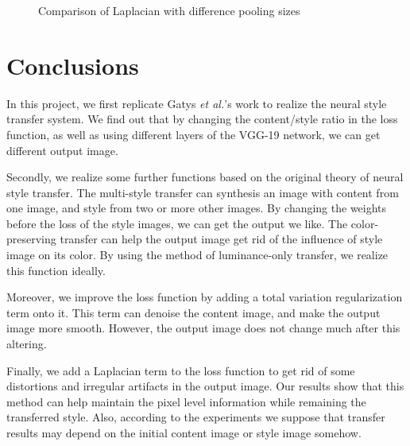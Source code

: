 \documentclass[runningheads]{llncs}
\begin{document}
\begin{figure}[h!]
\caption{Comparison of Laplacian with difference pooling sizes}
\label{fig:lap_size}
\end{figure}


\section{Conclusions}
In this project, we first replicate Gatys \textit{et al.}'s work to realize the neural style transfer system. We find out that by changing the content/style ratio in the loss function, as well as using different layers of the VGG-19 network, we can get different output image.

Secondly, we realize some further functions based on the original theory of neural style transfer. The multi-style transfer can synthesis an image with content from one image, and style from two or more other images. By changing the weights before the loss of the style images, we can get the output we like. The color-preserving transfer can help the output image get rid of the influence of style image on its color. By using the method of luminance-only transfer, we realize this function ideally.

Moreover, we improve the loss function by adding a total variation regularization term onto it. This term can denoise the content image, and make the output image more smooth. However, the output image does not change much after this altering.

Finally, we add a Laplacian term to the loss function to get rid of some distortions and irregular artifacts in the output image. Our results show that this method can help maintain the pixel level information while remaining the transferred style. Also, according to the experiments we suppose that transfer results may depend on the initial content image or style image somehow.
\end{document}
